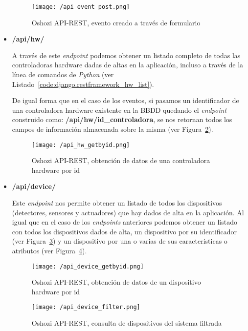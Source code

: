 \begin{itemize}
\begin{figure}[!h]
\centering
\texttt{[image: /api\_event\_post.png]}
\caption{Oshozi \acs{API}-\acs{REST}, evento creado a través de formulario}
\label{fig:api_event_post}
\end{figure}


\item \textbf{/api/hw/}

A través de este \textit{endpoint} podemos obtener un listado completo de todas las controladoras hardware dadas de altas en la aplicación, incluso a través de la línea de comandos de \textit{Python} (ver Listado~\ref{code:django.restframework_hw_list}). 



De igual forma que en el caso de los eventos, si pasamos un identificador de una controladora hardware existente en la \acs{BBDD} quedando el \textit{endpoint} construido como: \textbf{/api/hw/id\_controladora}, se nos retornan todos los campos de información almacenada sobre la misma (ver Figura~\ref{fig:api_hw_getbyid}).

\begin{figure}[!h]
\centering
\texttt{[image: /api\_hw\_getbyid.png]}
\caption{Oshozi \acs{API}-\acs{REST}, obtención de datos de una controladora hardware por id}
\label{fig:api_hw_getbyid}
\end{figure}

\item \textbf{/api/device/}

Este \textit{endpoint} nos permite obtener un listado de todos los dispositivos (detectores, sensores y actuadores) que hay dados de alta en la aplicación. Al igual que en el caso de los \textit{endpoints} anteriores podemos obtener un listado con todos los dispositivos dados de alta, un dispositivo por su identificador (ver Figura~\ref{fig:api_device_getbyid}) y un dispositivo por una o varias de sus características o atributos (ver Figura~\ref{fig:api_device_filter}).

\begin{figure}[h]
\centering
\texttt{[image: /api\_device\_getbyid.png]}
\caption{Oshozi \acs{API}-\acs{REST}, obtención de datos de un dispositivo hardware por id}
\label{fig:api_device_getbyid}
\end{figure}

\begin{figure}[!h]
\centering
\texttt{[image: /api\_device\_filter.png]}
\caption{Oshozi \acs{API}-\acs{REST}, consulta de dispositivos del sistema filtrada}
\label{fig:api_device_filter}
\end{figure}

\end{itemize}

